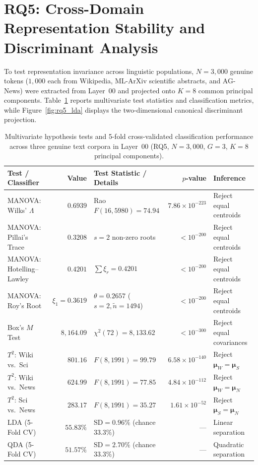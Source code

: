 \documentclass[12pt, a4paper, oneside]{report}
\theoremstyle{definition}
\begin{document}
\section{RQ5: Cross-Domain Representation Stability and Discriminant Analysis}

To test representation invariance across linguistic populations, $N = 3{,}000$ genuine tokens ($1{,}000$ each from Wikipedia, ML-ArXiv scientific abstracts, and AG-News) were extracted from Layer~00 and projected onto $K = 8$ common principal components. Table~\ref{tab:rq5_tests} reports multivariate test statistics and classification metrics, while Figure~\ref{fig:rq5_lda} displays the two-dimensional canonical discriminant projection.

\begin{table}[htbp]
    \centering
    \caption{Multivariate hypothesis tests and 5-fold cross-validated classification performance across three genuine text corpora in Layer~00 (RQ5, $N = 3{,}000$, $G = 3$, $K = 8$ principal components).}
    \label{tab:rq5_tests}
    \small
    \setlength{\tabcolsep}{6pt}
    \begin{tabular}{@{}l r l r l@{}}
        \toprule
        \textbf{Test / Classifier} & \textbf{Value} & \textbf{Test Statistic / Details} & \textbf{$p$-value} & \textbf{Inference} \\
        \midrule
        MANOVA: Wilks' $\Lambda$ & $0.6939$ & Rao $F(16, 5980) = 74.94$ & $7.86 \times 10^{-223}$ & Reject equal centroids \\
        MANOVA: Pillai's Trace & $0.3208$ & $s = 2$ non-zero roots & $< 10^{-200}$ & Reject equal centroids \\
        MANOVA: Hotelling--Lawley & $0.4201$ & $\sum \xi_r = 0.4201$ & $< 10^{-200}$ & Reject equal centroids \\
        MANOVA: Roy's Root & $\xi_1 = 0.3619$ & $\theta = 0.2657$ ($s=2, \tilde{n}=1494$) & $< 10^{-200}$ & Reject equal centroids \\
        Box's $M$ Test & $8{,}164.09$ & $\chi^2(72) = 8{,}133.62$ & $< 10^{-300}$ & Reject equal covariances \\
        \midrule
        $T^2$: Wiki vs.\ Sci & $801.16$ & $F(8, 1991) = 99.79$ & $6.58 \times 10^{-140}$ & Reject $\boldsymbol{\mu}_W = \boldsymbol{\mu}_S$ \\
        $T^2$: Wiki vs.\ News & $624.99$ & $F(8, 1991) = 77.85$ & $4.84 \times 10^{-112}$ & Reject $\boldsymbol{\mu}_W = \boldsymbol{\mu}_N$ \\
        $T^2$: Sci vs.\ News & $283.17$ & $F(8, 1991) = 35.27$ & $1.61 \times 10^{-52}$ & Reject $\boldsymbol{\mu}_S = \boldsymbol{\mu}_N$ \\
        \midrule
        LDA (5-Fold CV) & $55.83\%$ & $\text{SD} = 0.96\%$ (chance $33.3\%$) & --- & Linear separation \\
        QDA (5-Fold CV) & $51.57\%$ & $\text{SD} = 2.70\%$ (chance $33.3\%$) & --- & Quadratic separation \\
        \bottomrule
    \end{tabular}
\end{table}
\end{document}
